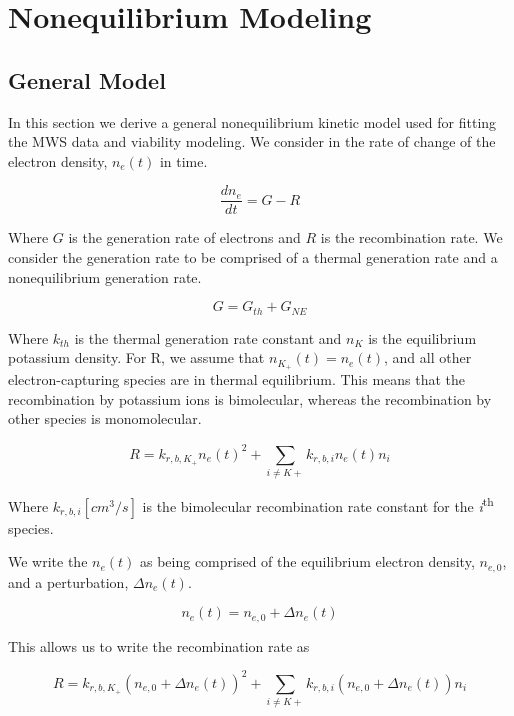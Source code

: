 \section{Nonequilibrium Modeling}

\subsection{General Model}

In this section we derive a general nonequilibrium kinetic model used for fitting the MWS data and viability modeling. We consider in the rate of change of the electron density, \(n_{e}(t)\) in time. 

\begin{equation}
  \label{eq:start_deqn}
\frac{dn_{e}}{dt} = G - R
\end{equation}

Where \(G\) is the generation rate of electrons and \(R\) is the recombination rate. We consider the generation rate to be comprised of a thermal generation rate and a nonequilibrium generation rate.

\begin{equation}
  G = G_{th} + G_{NE}
\end{equation}

Where \(k_{th}\) is the thermal generation rate constant and \(n_{K}\) is the equilibrium potassium density. For R, we assume that $n_{K_+}(t) = n_{e}(t)$, and all other electron-capturing species are in thermal equilibrium. This means that the recombination by potassium ions is bimolecular, whereas the recombination by other species is monomolecular.

\begin{equation}
R = k_{r, b, K_{+}}n_{e}(t)^2 + \sum_{i \neq K+}^{}k_{r, b, i}n_{e}(t)n_{i}
\end{equation}

Where $k_{r, b, i} [cm^3/s]$ is the bimolecular recombination rate constant for the \emph{i}\textsuperscript{th} species. 

We write the $n_{e}(t)$ as being comprised of the equilibrium electron density, \(n_{e,0}\), and a perturbation, \(\Delta n_{e}(t)\).

\begin{equation}
  \label{eq:ne_pert}
n_{e}(t) = n_{e,0} + \Delta n_{e}(t)
\end{equation}

This allows us to write the recombination rate as

\begin{equation}
R = k_{r, b, K_{+}}(n_{e,0} + \Delta n_{e}(t))^2 + \sum_{i \neq K+}^{}k_{r, b, i}(n_{e,0} + \Delta n_{e}(t))n_{i}
\end{equation}

